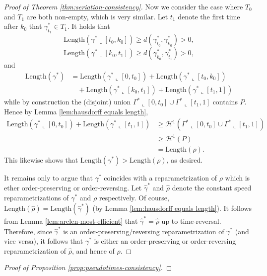 \documentclass[aos, preprint]{imsart}
\theoremstyle{plain}
\theoremstyle{remark}
\begin{document}
\begin{appendix}
\begin{proof}[Proof of Theorem \ref{thm:seriation-consistency}]
Now we consider the case where $T_{0}$ and $T_{1}$ are both non-empty,
which is very similar. Let $t_1$ denote the first time after $k_0$ that $\gamma^*_{t_1}\in T_1$. It holds that
\[
\text{Length}(\gamma^*\llcorner[t_{0},k_{0}])\geq d(\gamma^*_{t_{0}},\gamma^*_{k_{0}})>0,
\]
\[
\text{Length}(\gamma^*\llcorner[k_{0},t_{1}])\geq d(\gamma^*_{k_{0}},\gamma^*_{t_{1}})>0,
\]
and
\begin{align*}
\text{Length}(\gamma^*)
&= \text{Length}(\gamma^*\llcorner[0,t_{0}])+\text{Length}(\gamma^*\llcorner[t_{0},k_{0}])\\
& \quad +\text{Length}(\gamma^*\llcorner[k_{0},t_{1}])+\text{Length}(\gamma^*\llcorner[t_{1},1])
\end{align*}
while by construction the (disjoint) union $\Gamma^*\llcorner[0,t_{0}]\cup\Gamma^*\llcorner[t_{1},1]$
contains $P$. Hence by Lemma \ref{lem:hausdorff equals length},
\begin{align*}
\text{Length}(\gamma^*\llcorner[0,t_{0}])+\text{Length}(\gamma^*\llcorner[t_{1},1]) & \geq\mathcal{H}^{1}(\Gamma^*\llcorner[0,t_{0}]\cup\Gamma^*\llcorner[t_{1},1])\\
 & \geq\mathcal{H}^{1}(P)\\
 & =\text{Length}(\rho).
\end{align*}
This likewise shows that $\text{Length}(\gamma^*)>\text{Length}(\rho)$,
as desired.

It remains only to argue that $\gamma^*$ coincides with a reparametrization of $\rho$ which is ether order-preserving or order-reversing. Let $\hat{\gamma}^*$ and $\hat{\rho}$ denote the constant speed reparametrizations of $\gamma^*$ and $\rho$ respectively. Of course, $\mathrm{Length}(\hat{\rho})=\mathrm{Length}(\hat{\gamma}^*)$ (by Lemma \ref{lem:hausdorff equals length}). It follows from Lemma \ref{lem:arclen-most-efficient} that $\hat{\gamma}^*=\hat{\rho}$ up to time-reversal. Therefore, since $\hat{\gamma}^*$ is an order-preserving/reversing reparametrization of $\gamma^*$ (and vice versa), it follows that $\gamma^*$ is either an order-preserving or order-reversing reparametrization of $\hat{\rho}$, and hence of $\rho$.
\end{proof}

\begin{proof}[Proof of Proposition
  \ref{prop:pseudotimes-consistency}]


\end{proof}
\end{appendix}
\end{document}
